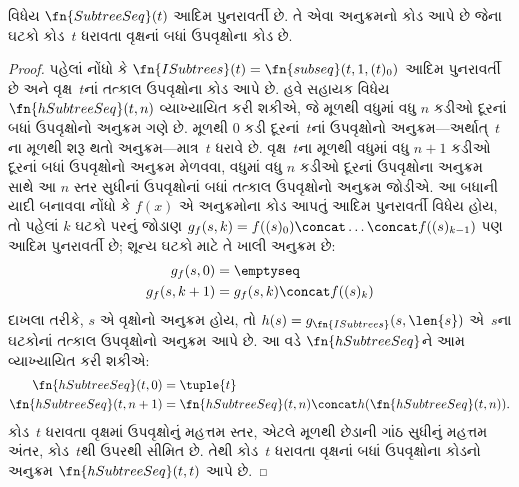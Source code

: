 \begin{prop}
  વિધેય $\fn{SubtreeSeq}(t)$ આદિમ પુનરાવર્તી છે. તે એવા
  અનુક્રમનો કોડ આપે છે જેના ઘટકો કોડ~$t$ ધરાવતા વૃક્ષનાં બધાં
  ઉપવૃક્ષોના કોડ છે.
\end{prop}

\begin{proof}
  પહેલાં નોંધો કે $\fn{ISubtrees}(t) = \fn{subseq}(t, 1, (t)_0)$
  આદિમ પુનરાવર્તી છે અને વૃક્ષ~$t$નાં તત્કાલ ઉપવૃક્ષોના કોડ આપે
  છે. હવે સહાયક વિધેય $\fn{hSubtreeSeq}(t,n)$ વ્યાખ્યાયિત કરી
  શકીએ, જે મૂળથી વધુમાં વધુ $n$ કડીઓ દૂરનાં બધાં ઉપવૃક્ષોનો
  અનુક્રમ ગણે છે. મૂળથી $0$ કડી દૂરનાં~$t$નાં ઉપવૃક્ષોનો
  અનુક્રમ---અર્થાત્~$t$ના મૂળથી શરૂ થતો અનુક્રમ---માત્ર~$t$ ધરાવે છે.
  વૃક્ષ~$t$ના મૂળથી વધુમાં વધુ $n+1$ કડીઓ દૂરનાં બધાં ઉપવૃક્ષોનો
  અનુક્રમ મેળવવા, વધુમાં વધુ $n$ કડીઓ દૂરનાં ઉપવૃક્ષોના અનુક્રમ
  સાથે આ $n$ સ્તર સુધીનાં ઉપવૃક્ષોનાં બધાં તત્કાલ ઉપવૃક્ષોનો
  અનુક્રમ જોડીએ. આ બધાની યાદી બનાવવા નોંધો કે
  $f(x)$ એ અનુક્રમોના કોડ આપતું આદિમ પુનરાવર્તી વિધેય હોય, તો
  પહેલાં $k$ ઘટકો પરનું જોડાણ $g_f(s, k) = f((s)_0) \concat
  \dots \concat f((s)_{k-1})$ પણ આદિમ પુનરાવર્તી છે; શૂન્ય
  ઘટકો માટે તે ખાલી અનુક્રમ છે:
    \begin{align*}
      g_f(s, 0) & = \emptyseq\\
      g_f(s, k+1) & = g_f(s, k) \concat f((s)_k)
    \end{align*}
    દાખલા તરીકે, $s$ એ વૃક્ષોનો અનુક્રમ હોય, તો
    $h(s) = g_{\fn{ISubtrees}}(s, \len{s})$ એ~$s$ના ઘટકોનાં
    તત્કાલ ઉપવૃક્ષોનો અનુક્રમ આપે છે. આ વડે $\fn{hSubtreeSeq}$ને
    આમ વ્યાખ્યાયિત કરી શકીએ:
    \begin{align*}
      \fn{hSubtreeSeq}(t, 0) & = \tuple{t} \\
      \fn{hSubtreeSeq}(t, n+1) & = \fn{hSubtreeSeq}(t, n) \concat
      h(\fn{hSubtreeSeq}(t, n)).
    \end{align*}
    કોડ~$t$ ધરાવતા વૃક્ષમાં ઉપવૃક્ષોનું મહત્તમ સ્તર, એટલે મૂળથી
    છેડાની ગાંઠ સુધીનું મહત્તમ અંતર, કોડ~$t$થી ઉપરથી સીમિત છે.
    તેથી કોડ~$t$ ધરાવતા વૃક્ષનાં બધાં ઉપવૃક્ષોના કોડનો અનુક્રમ
    $\fn{hSubtreeSeq}(t, t)$ આપે છે.
\end{proof}

